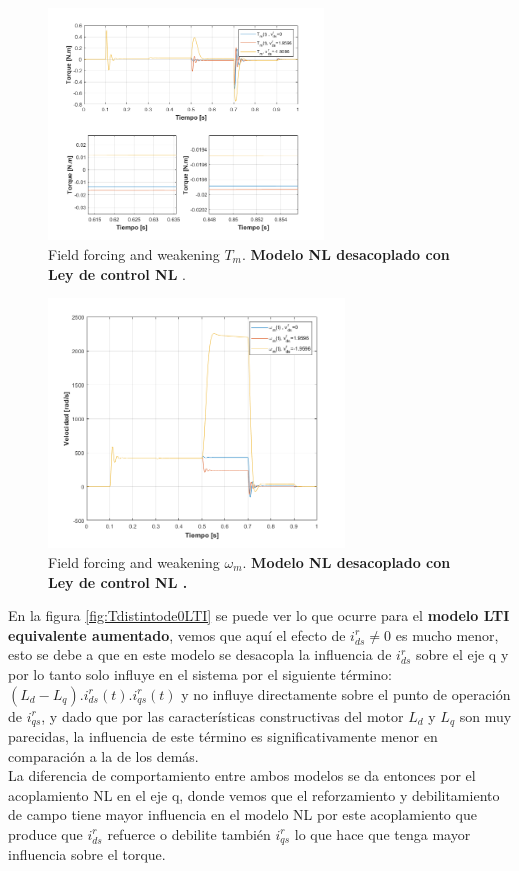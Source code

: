 \documentclass[10pt]{article}
\begin{document}
\begin{itemize}
	\begin{figure}[h!]
	\centering
	\includegraphics[width=0.65\textwidth]{Tdistintode0.png}
	\caption{\label{fig:Tdistintode0} Field forcing and weakening $T_{m}$. \textbf{Modelo NL desacoplado con Ley de control NL }.}
	\end{figure}
	
	\begin{figure}[h!]
	\centering
	\includegraphics[width=0.7\textwidth]{wdistintode0.png}
	\caption{\label{fig:wdistintode0} Field forcing and weakening $\omega_{m}$.\textbf{ Modelo NL desacoplado con Ley de control NL .}}
	\end{figure}
	
	En la figura \ref{fig:Tdistintode0LTI} se puede ver lo que ocurre para el \textbf{modelo LTI equivalente aumentado}, vemos que aquí el efecto de $i^{r}_{ds}\neq 0$ es mucho menor, esto se debe a que en este modelo se desacopla la influencia de $i^{r}_{ds}$ sobre el eje q y por lo tanto solo influye en el sistema por el siguiente término: $(L_{d}-L_{q}).i^{r}_{ds}(t).i^{r}_{qs}(t)$ y no influye directamente sobre el punto de operación de $i^{r}_{qs}$, y dado que por las características constructivas del motor $L_{d}$ y $L_{q}$ son muy parecidas, la influencia de este término es significativamente menor en comparación a la de los demás.\\
	La diferencia de comportamiento entre ambos modelos se da entonces por el acoplamiento NL en el eje q, donde vemos que el reforzamiento y debilitamiento de campo tiene mayor influencia en el modelo NL por este acoplamiento que produce que $i^{r}_{ds}$ refuerce o debilite también $i^{r}_{qs}$ lo que hace que tenga mayor influencia sobre el torque.
	

\end{itemize}
\end{document}
